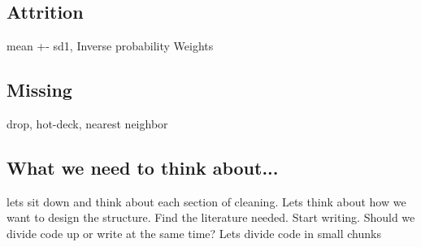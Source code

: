 \subsection*{Attrition}
mean +- sd1, Inverse probability Weights

\subsection*{Missing}
drop, hot-deck, nearest neighbor 

\subsection*{What we need to think about...}
lets sit down and think about each section of cleaning. Lets think about how we want to design the structure. Find the literature needed. Start writing. Should we divide code up or write at the same time? Lets divide code in small chunks